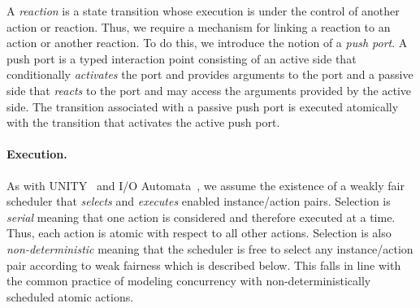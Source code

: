 A \emph{reaction} is a state transition whose execution is under the control of another action or reaction.
Thus, we require a mechanism for linking a reaction to an action or another reaction.
To do this, we introduce the notion of a \emph{push port}.
A push port is a typed interaction point consisting of an active side that conditionally \emph{activates} the port and provides arguments to the port and a passive side that \emph{reacts} to the port and may access the arguments provided by the active side.
The transition associated with a passive push port is executed atomically with the transition that activates the active push port.

\paragraph{Execution.}
As with UNITY~\cite{chandy1989parallel} and I/O Automata~\cite{nancy1996distributed}, we assume the existence of a weakly fair scheduler that \emph{selects} and \emph{executes} enabled instance/action pairs.
Selection is \emph{serial} meaning that one action is considered and therefore executed at a time.
Thus, each action is atomic with respect to all other actions.
Selection is also \emph{non-deterministic} meaning that the scheduler is free to select any instance/action pair according to weak fairness which is described below.
This falls in line with the common practice of modeling concurrency with non-deterministically scheduled atomic actions.

